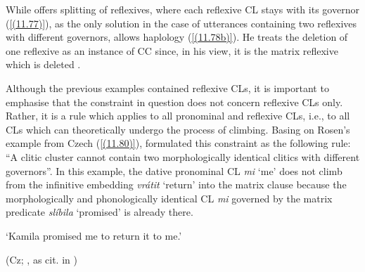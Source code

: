 \noindent While \citet{Junghanns02} offers splitting of reflexives, where each reflexive CL stays with its governor (\ref{(11.77)}), as the only solution in the case of utterances containing two reflexives with different governors, \citet{Rosen14} allows haplology (\ref{(11.78b)}). He treats the deletion of one reflexive as an instance of CC since, in his view, it is the matrix reflexive which is deleted \citep[cf.][106, 114]{Rosen14}.

Although the previous examples contained reflexive CLs, it is important to emphasise that the constraint in question does not concern reflexive CLs only. Rather, it is a rule which applies to all pronominal and reflexive CLs, i.e., to all CLs which can theoretically undergo the process of climbing. Basing on Rosen’s example from Czech (\ref{(11.80)}), \citet[123]{Hana07} formulated this constraint as the following rule: “A clitic cluster cannot contain two morphologically identical clitics with different governors”. In this example, the dative pronominal CL \textit{mi} ‘me’ does not climb from the infinitive embedding \textit{vrátit} ‘return’ into the matrix clause because the morphologically and phonologically identical CL \textit{mi} governed by the matrix predicate \textit{slíbila} ‘promised’ is already there.


\begin{exe}\ex
\begin{xlist}
\end{xlist}
\glt‘Kamila promised me to return it to me.’ \\
\strut\hfill (Cz; \citealt{Rosen01}, as cit. in \citealt[123]{Hana07})
\end{exe}

